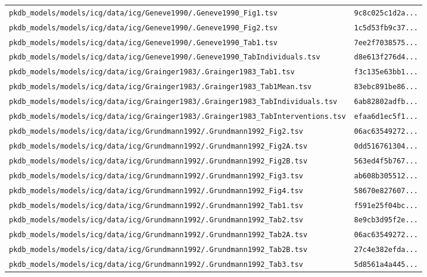 \begin{longtable}{ll}
\texttt{pkdb\_models/models/icg/data/icg/Geneve1990/.Geneve1990\_Fig1.tsv} & \texttt{9c8c025c1d2a...} \\
\texttt{pkdb\_models/models/icg/data/icg/Geneve1990/.Geneve1990\_Fig2.tsv} & \texttt{1c5d53fb9c37...} \\
\texttt{pkdb\_models/models/icg/data/icg/Geneve1990/.Geneve1990\_Tab1.tsv} & \texttt{7ee2f7038575...} \\
\texttt{pkdb\_models/models/icg/data/icg/Geneve1990/.Geneve1990\_TabIndividuals.tsv} & \texttt{d8e613f276d4...} \\
\texttt{pkdb\_models/models/icg/data/icg/Grainger1983/.Grainger1983\_Tab1.tsv} & \texttt{f3c135e63bb1...} \\
\texttt{pkdb\_models/models/icg/data/icg/Grainger1983/.Grainger1983\_Tab1Mean.tsv} & \texttt{83ebc891be86...} \\
\texttt{pkdb\_models/models/icg/data/icg/Grainger1983/.Grainger1983\_TabIndividuals.tsv} & \texttt{6ab82802adfb...} \\
\texttt{pkdb\_models/models/icg/data/icg/Grainger1983/.Grainger1983\_TabInterventions.tsv} & \texttt{efaa6d1ec5f1...} \\
\texttt{pkdb\_models/models/icg/data/icg/Grundmann1992/.Grundmann1992\_Fig2.tsv} & \texttt{06ac63549272...} \\
\texttt{pkdb\_models/models/icg/data/icg/Grundmann1992/.Grundmann1992\_Fig2A.tsv} & \texttt{0dd516761304...} \\
\texttt{pkdb\_models/models/icg/data/icg/Grundmann1992/.Grundmann1992\_Fig2B.tsv} & \texttt{563ed4f5b767...} \\
\texttt{pkdb\_models/models/icg/data/icg/Grundmann1992/.Grundmann1992\_Fig3.tsv} & \texttt{ab608b305512...} \\
\texttt{pkdb\_models/models/icg/data/icg/Grundmann1992/.Grundmann1992\_Fig4.tsv} & \texttt{58670e827607...} \\
\texttt{pkdb\_models/models/icg/data/icg/Grundmann1992/.Grundmann1992\_Tab1.tsv} & \texttt{f591e25f04bc...} \\
\texttt{pkdb\_models/models/icg/data/icg/Grundmann1992/.Grundmann1992\_Tab2.tsv} & \texttt{8e9cb3d95f2e...} \\
\texttt{pkdb\_models/models/icg/data/icg/Grundmann1992/.Grundmann1992\_Tab2A.tsv} & \texttt{06ac63549272...} \\
\texttt{pkdb\_models/models/icg/data/icg/Grundmann1992/.Grundmann1992\_Tab2B.tsv} & \texttt{27c4e382efda...} \\
\texttt{pkdb\_models/models/icg/data/icg/Grundmann1992/.Grundmann1992\_Tab3.tsv} & \texttt{5d8561a4a445...} \\

\end{longtable}
